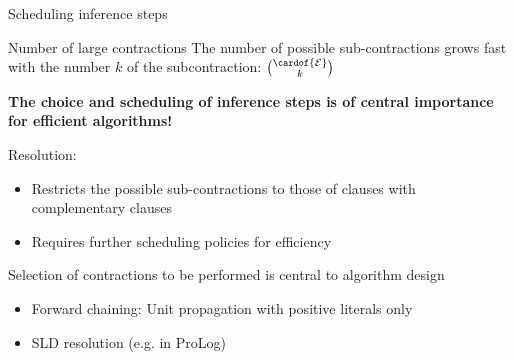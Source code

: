 \documentclass{beamer}
\begin{document}
    \begin{frame}{Scheduling inference steps}

        \begin{block}{Number of large contractions}
            The number of possible sub-contractions grows fast with the number $k$ of the subcontraction: $\binom{\cardof{\edges}}{k}$
        \end{block}
        \begin{center}
            \bf The choice and scheduling of inference steps is of central importance for efficient algorithms!
        \end{center}

        Resolution:
        \begin{itemize}
            \item Restricts the possible sub-contractions to those of clauses with complementary clauses
            \item Requires further scheduling policies for efficiency
        \end{itemize}

        Selection of contractions to be performed is central to algorithm design
        \begin{itemize}
            \item Forward chaining: Unit propagation with positive literals only
            \item SLD resolution (e.g. in ProLog)
        \end{itemize}

    \end{frame}
\end{document}
